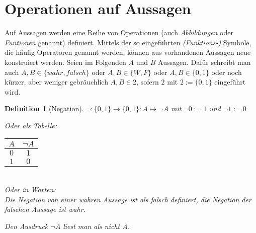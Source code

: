 \documentclass[a4paper]{article}
\newtheorem{definition}[satz]{Definition} %
\theoremstyle{nonumberplain}
\begin{document}
\section{Operationen auf Aussagen}

Auf Aussagen werden eine Reihe von Operationen (auch \textit{Abbildungen} oder \textit{Funtionen} genannt) definiert. Mittels der so eingeführten \textit{(Funktions-)} Symbole, die häufig Operatoren genannt werden, können aus vorhandenen Aussagen neue konstruiert werden. Seien im Folgenden $A$ und $B$ Aussagen. Dafür schreibt man auch $A,B \in \lbrace wahr, falsch \rbrace$ oder $A,B \in \lbrace W,F \rbrace$ oder $A,B \in \lbrace 0, 1 \rbrace$ oder noch kürzer, aber weniger gebräuchlich $A,B \in 2$, sofern $2$ mit $2:= \lbrace 0, 1 \rbrace$ eingeführt wird.

\begin{definition}[Negation]
$\neg:\lbrace 0,1 \rbrace\to \lbrace 0,1 \rbrace :  A \mapsto \neg A$ mit $\neg 0 := 1$ und
$\neg 1 := 0$
\begin{multicols}{2}
	Oder als Tabelle: \hspace{9mm}
	\begin{tabular}{|c|c|} %
		\hline
		$A$ & $\neg A$ \\
		\hline
		$0$ & $1$
		\\
		$1$ & $0$
		\\
		\hline
	\end{tabular} \\
	Oder in Worten: \\ Die Negation von einer wahren Aussage ist als falsch definiert, die Negation der falschen Aussage ist wahr.
\end{multicols}
Den Ausdruck $\neg A$ liest man als \glqq nicht A\grqq .
\end{definition}
\end{document}
